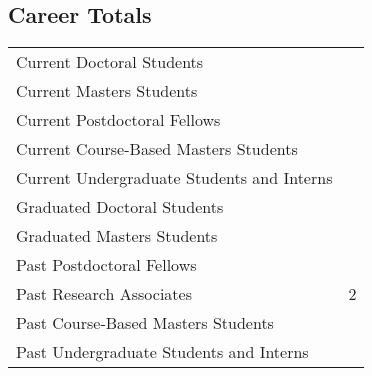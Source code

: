 
\subsection{Career Totals}
\begin{center}
	\begin{tabularx}{0.5\linewidth}{lR}		
		\midrule
		Current Doctoral Students & \numcurrentphd{} \\ 
		Current Masters Students & \numcurrentms{} \\ 
		Current Postdoctoral Fellows & \numcurrentpdf{} \\ 
		Current Course-Based Masters Students & \numcurrentmeng{} \\
		Current Undergraduate Students and Interns & \numcurrentug{} \\
		Graduated Doctoral Students & \numcompletedphd{} \\ 
		Graduated Masters Students & \numcompletedms{} \\ 
		Past Postdoctoral Fellows & \numcompletedpdf{} \\ 
		Past Research Associates & 2 \\
		Past Course-Based Masters Students & \numcompletedmeng{} \\
		Past Undergraduate Students and Interns & \numpastug{} \\
		\midrule
	\end{tabularx}
\end{center}
